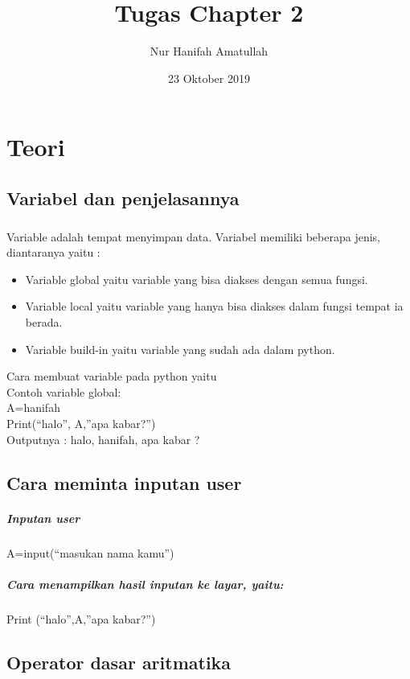 \documentclass[a4paper,12pt]{report}
\title{Tugas Chapter 2}
\author{Nur Hanifah Amatullah}
\date{23 Oktober 2019}
\begin{document}
\maketitle
\chapter*{Teori}
\section*{Variabel dan penjelasannya}
\paragraph{}
Variable adalah tempat menyimpan data. Variabel memiliki beberapa jenis, diantaranya yaitu :\\
\begin{itemize}
\item Variable global yaitu variable yang bisa  diakses dengan semua fungsi.\\
\item Variable local yaitu variable yang hanya bisa diakses dalam fungsi tempat ia berada.\\
\item Variable build-in yaitu variable yang sudah ada dalam python.\\
\end{itemize}
Cara membuat variable pada python yaitu\\ 
Contoh variable global:\\
A=hanifah\\
Print(“halo”, A,”apa kabar?”)\\
Outputnya : halo, hanifah, apa kabar ?\\
\section*{Cara meminta inputan user}
\paragraph{Inputan user}
A=input(“masukan nama kamu”)
\paragraph{Cara menampilkan hasil inputan ke layar, yaitu:}
Print (“halo”,A,”apa kabar?”)
\section*{Operator dasar aritmatika}
\end{document}
